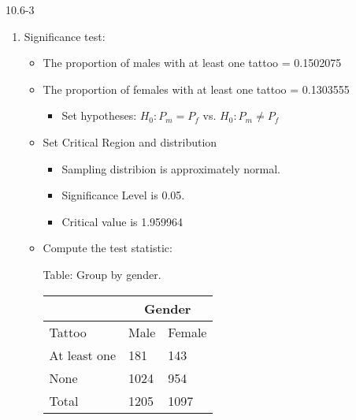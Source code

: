 \begin{exsol@solution}{10.6-3}

  	  \begin{enumerate}
	 \item Significance test:


\begin{itemize}
\item The proportion of males with at least one tattoo = 0.1502075
\item The proportion of females with at least one tattoo = 0.1303555
  \begin{itemize}
  \item Set hypotheses: $H_0: P_m = P_f$ vs. $H_0: P_m \ne P_f$
  \end{itemize}

\item Set Critical Region and distribution

  \begin{itemize}
  \item Sampling distribion is approximately normal.
  \item Significance Level is 0.05.
  \item Critical value is 1.959964
  \end{itemize}

\item Compute the test statistic:

\begin{minipage}[h]{6cm}

Table: Group  by gender.

      \begin{tabular}{@{} p{2.5cm} p{1cm} p{1cm} @{}} \hline %
     &  \multicolumn{2}{c}{Gender } \\ \hline
     Tattoo   & Male & Female \\ \hline
     At least one   & 181 & 143 \\
     None          & 1024 & 954 \\ \hline
     Total        & 1205 & 1097 \\ \hline
   \end{tabular}

\end{minipage} \hfill
\begin{minipage}[h]{6cm}


\end{minipage}
\end{itemize}
\end{enumerate}
\end{exsol@solution}
